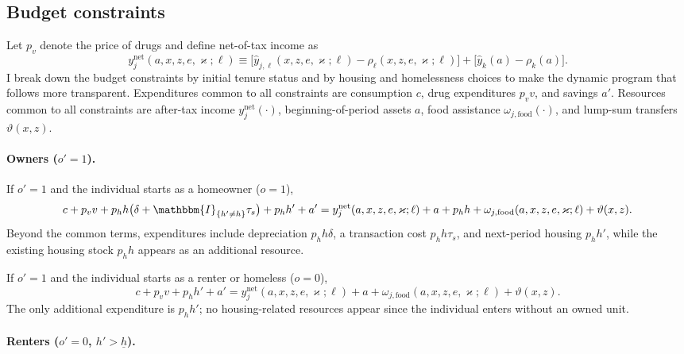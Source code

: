 \documentclass[parskip=full]{article}
\theoremstyle{plain}
\theoremstyle{definition}
\theoremstyle{remark}
\begin{document}
\subsection{Budget constraints}\label{sec:budget}

Let $p_v$ denote the price of drugs and define net-of-tax income as
\[y_j^{\text{net}}(a,x,z,e,\varkappa;\ell)\equiv
\big[\hat y_{j,\ell}(x,z,e,\varkappa;\ell)-\rho_{\ell}(x,z,e,\varkappa;\ell)\big]+\big[\hat y_k(a)-\rho_k(a)\big].\]
I break down the budget constraints by initial tenure status and by housing and homelessness choices to make the dynamic program that follows more transparent. Expenditures common to all constraints are consumption $c$, drug expenditures $p_v v$, and savings $a'$. Resources common to all constraints are after-tax income $y_j^{\text{net}}(\cdot)$, beginning-of-period assets $a$, food assistance $\omega_{j,\text{food}}(\cdot)$, and lump-sum transfers $\vartheta(x,z)$.

\paragraph{Owners ($o'=1$).}

If $o'=1$ and the individual starts as a homeowner ($o=1$),
\begin{equation}\label{eq:bc_owner_from_owner}
c+p_v v + p_h h\big(\delta+\mathbbm{I}_{\{h'\neq h\}}\tau_s\big) + p_h h' + a'
= y_j^{\text{net}}(a,x,z,e,\varkappa;\ell)+a+p_h h+\omega_{j,\text{food}}(a,x,z,e,\varkappa;\ell)+\vartheta(x,z).
\end{equation}
Beyond the common terms, expenditures include depreciation $p_h 
h\delta$, a transaction cost $p_h h\tau_s$, and next-period housing 
$p_h h'$, while the existing housing stock $p_h h$ appears as an 
additional resource.

If $o'=1$ and the individual starts as a renter or homeless ($o=0$),
\begin{equation}\label{eq:bc_owner_from_renter}
c+p_v v + p_h h' + a'=y_j^{\text{net}}(a,x,z,e,\varkappa;\ell)+a+\omega_{j,\text{food}}(a,x,z,e,\varkappa;\ell)+\vartheta(x,z).
\end{equation}
The only additional expenditure is $p_h h'$; no housing-related 
resources appear since the individual enters without an owned unit.

\paragraph{Renters ($o'=0$, $h'>\underline h$).}
\end{document}
